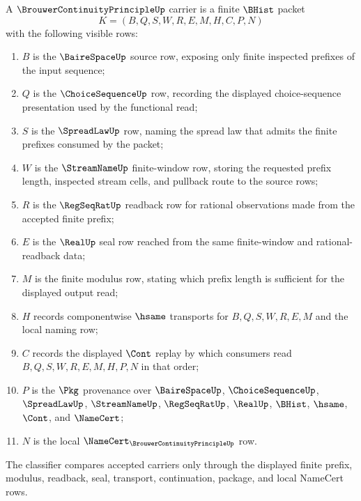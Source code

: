 \begin{definition}
\label{def:brouwer-continuity-principle-carrier}
A $\BrouwerContinuityPrincipleUp$ carrier is a finite $\BHist$ packet
$$
K=(B,Q,S,W,R,E,M,H,C,P,N)
$$
with the following visible rows:
\begin{enumerate}
\item $B$ is the $\BaireSpaceUp$ source row, exposing only finite inspected prefixes of the input sequence;
\item $Q$ is the $\ChoiceSequenceUp$ row, recording the displayed choice-sequence presentation used by the functional read;
\item $S$ is the $\SpreadLawUp$ row, naming the spread law that admits the finite prefixes consumed by the packet;
\item $W$ is the $\StreamNameUp$ finite-window row, storing the requested prefix length, inspected stream cells, and pullback route to the source rows;
\item $R$ is the $\RegSeqRatUp$ readback row for rational observations made from the accepted finite prefix;
\item $E$ is the $\RealUp$ seal row reached from the same finite-window and rational-readback data;
\item $M$ is the finite modulus row, stating which prefix length is sufficient for the displayed output read;
\item $H$ records componentwise $\hsame$ transports for $B,Q,S,W,R,E,M$ and the local naming row;
\item $C$ records the displayed $\Cont$ replay by which consumers read $B,Q,S,W,R,E,M,H,P,N$ in that order;
\item $P$ is the $\Pkg$ provenance over $\BaireSpaceUp$, $\ChoiceSequenceUp$, $\SpreadLawUp$, $\StreamNameUp$, $\RegSeqRatUp$, $\RealUp$, $\BHist$, $\hsame$, $\Cont$, and $\NameCert$;
\item $N$ is the local $\NameCert_{\BrouwerContinuityPrincipleUp}$ row.
\end{enumerate}
The classifier compares accepted carriers only through the displayed finite prefix, modulus, readback, seal, transport, continuation, package, and local NameCert rows.
\end{definition}

